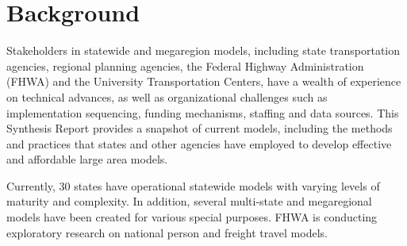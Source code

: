 \section{Background}

Stakeholders in statewide and megaregion models, including state transportation agencies, regional planning agencies, the Federal Highway Administration (FHWA) and the University Transportation Centers, have a wealth of experience on technical advances, as well as organizational challenges such as implementation sequencing, funding mechanisms, staffing and data sources. This Synthesis Report provides a snapshot of current models, including the methods and practices that states and other agencies have employed to develop effective and affordable large area models.

Currently, 30 states have operational statewide models with varying levels of maturity and complexity. In addition, several multi-state and megaregional models have been created for various special purposes. FHWA is conducting exploratory research on national person and freight travel models.

